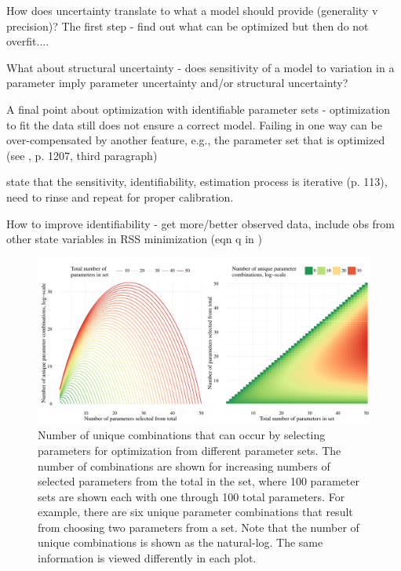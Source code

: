 \documentclass[letterpaper,12pt,oneside]{article}\usepackage[]{graphicx}\usepackage[]{color}
\begin{document}
How does uncertainty translate to what a model should provide (generality v precision)?  The first step - find out what can be optimized but then do not overfit....

What about structural uncertainty - does sensitivity of a model to variation in a parameter imply parameter uncertainty and/or structural uncertainty?

A final point about optimization with identifiable parameter sets - optimization to fit the data still does not ensure a correct model.  Failing in one way can be over-compensated by another feature, e.g., the parameter set that is optimized (see \cite{Flynn05}, p. 1207, third paragraph)

\cite{Omlin01} state that the sensitivity, identifiability, estimation process is iterative (p. 113), need to rinse and repeat for proper calibration. 

How to improve identifiability - get more/better observed data, include obs from other state variables in RSS minimization (eqn q in \cite{Omlin01})

\clearpage
\begin{singlespace}


\end{singlespace}
\clearpage

\begin{figure}[!ht]

{\centering \includegraphics[width=\textwidth]{figs/unnamed-chunk-3-1} 

}

\caption[Number of unique combinations that can occur by selecting parameters for optimization from different parameter sets]{Number of unique combinations that can occur by selecting parameters for optimization from different parameter sets.  The number of combinations are shown for increasing numbers of selected parameters from the total in the set, where 100 parameter sets are shown each with one through 100 total parameters.  For example, there are six unique parameter combinations that result from choosing two parameters from a set.  Note that the number of unique combinations is shown as the natural-log.  The same information is viewed differently in each plot.}\label{fig:unnamed-chunk-3}
\end{figure}
\end{document}
